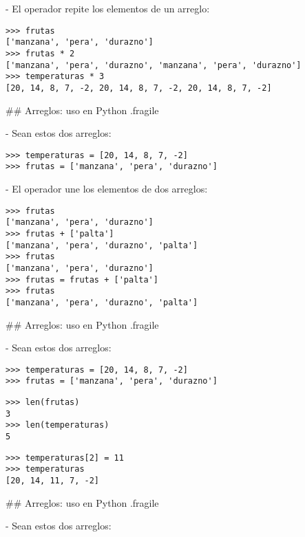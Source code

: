 - El operador \nzinlinecode{*} repite los elementos de un arreglo:

\begin{lstlisting}[style=frame03]
>>> frutas
['manzana', 'pera', 'durazno']
>>> frutas * 2
['manzana', 'pera', 'durazno', 'manzana', 'pera', 'durazno']
>>> temperaturas * 3
[20, 14, 8, 7, -2, 20, 14, 8, 7, -2, 20, 14, 8, 7, -2]
\end{lstlisting}

## Arreglos: uso en Python {.fragile}

- Sean estos dos arreglos:

\begin{lstlisting}[style=frame03]
>>> temperaturas = [20, 14, 8, 7, -2]
>>> frutas = ['manzana', 'pera', 'durazno']
\end{lstlisting}


- El operador \nzinlinecode{+} une los elementos de dos arreglos:

\begin{lstlisting}[style=frame03]
>>> frutas
['manzana', 'pera', 'durazno']
>>> frutas + ['palta']
['manzana', 'pera', 'durazno', 'palta']
>>> frutas
['manzana', 'pera', 'durazno']
>>> frutas = frutas + ['palta']
>>> frutas
['manzana', 'pera', 'durazno', 'palta']
\end{lstlisting}

## Arreglos: uso en Python {.fragile}

- Sean estos dos arreglos:

\begin{lstlisting}[style=frame03]
>>> temperaturas = [20, 14, 8, 7, -2]
>>> frutas = ['manzana', 'pera', 'durazno']
\end{lstlisting}


\begin{lstlisting}[style=frame03]
>>> len(frutas)
3
>>> len(temperaturas)
5
\end{lstlisting}


\begin{lstlisting}[style=frame03]
>>> temperaturas[2] = 11
>>> temperaturas
[20, 14, 11, 7, -2]
\end{lstlisting}

## Arreglos: uso en Python {.fragile}

- Sean estos dos arreglos:

